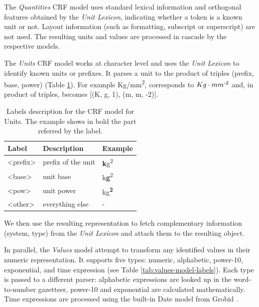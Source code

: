 \documentclass[sigconf]{acmart}
\begin{document}
The \textit{Quantities} CRF model uses standard lexical information and orthogonal features obtained by the \textit{Unit Lexicon}, indicating whether a token is a known unit or not. Layout information (such as formatting, subscript or superscript) are not used. The resulting units and values are processed in cascade by the respective models. 

The \textit{Units} CRF model works at character level and uses the \textit{Unit Lexicon} to identify known units or prefixes. It parses a unit to the product of triples (prefix, base, power) (Table \ref{tab:units-model-labels}). For example Kg/mm\textsuperscript{2}, corresponds to $Kg\cdot mm\textsuperscript{-2}$ and, in product of triples, becomes [(K, g, 1), (m, m, -2)]. 

\begin{table}[ht]
  \caption{Labels description for the CRF model for Units. The example shows in bold the part referred by the label. }
  \label{tab:units-model-labels}
  \begin{tabular}{lll}
    \toprule
    Label & Description & Example\\
    \midrule
    <prefix> & prefix of the unit  & \textbf{k}g\textsuperscript{2} \\
    <base> & unit base & k\textbf{g}\textsuperscript{2}\\
    <pow> & unit power & kg\textsuperscript{\textbf{2}}\\
    <other> & everything else & - \\
  \bottomrule
\end{tabular}
\end{table}

We then use the resulting representation to fetch complementary information (system, type) from the \textit{Unit Lexicon} and attach them to the resulting object. 

In parallel, the \textit{Values} model attempt to transform any identified values in their numeric representation. It supports five types: numeric, alphabetic, power-10, exponential, and time expression (see Table \ref{tab:values-model-labels}). Each type is passed to a different parser: alphabetic expressions are looked up in the word-to-number gazetteer, power-10 and exponential are calculated mathematically. Time expressions are processed using the built-in Date model from Grobid \cite{GROBID}.
\end{document}
